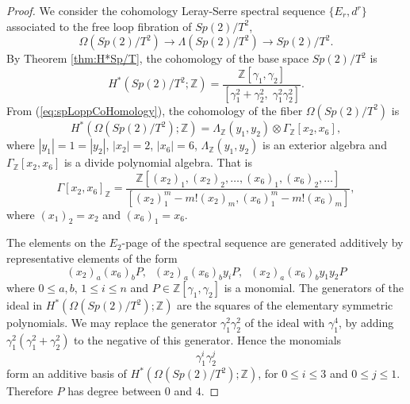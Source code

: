 \documentclass{article}
\theoremstyle{plain}
\theoremstyle{definition}
\numberwithin{thm}{section}
\begin{document}
		\begin{proof}
			We consider the cohomology Leray-Serre spectral sequence $\{ E_r,d^r \}$ associated to the free loop fibration of $Sp(2)/T^2$,
			\begin{equation*}
				\Omega(Sp(2)/T^2)\to\Lambda(Sp(2)/T^2)\to Sp(2)/T^2.
			\end{equation*}
			By Theorem \ref{thm:H*Sp/T},
			the cohomology of the base space $Sp(2)/T^2$ is
			\begin{equation*}
				H^*(Sp(2)/T^2;\mathbb{Z})=\frac{\mathbb{Z}[\gamma_1,\gamma_2]}{[\gamma_1^2+\gamma_2^2,\;\gamma_1^2\gamma_2^2]}.
			\end{equation*}
			From (\ref{eq:spLoppCoHomology}), the cohomology of the fiber $\Omega(Sp(2)/T^2)$ is
			\begin{equation*}
				H^*(\Omega(Sp(2)/T^2);\mathbb{Z})=\Lambda_{\mathbb{Z}}(y_1,y_2)\otimes \Gamma_{\mathbb{Z}}[x_2,x_6],
			\end{equation*}
			where $|y_1|=1=|y_2|$, $|x_2|=2$, $|x_6|=6$, $\Lambda_{\mathbb{Z}}(y_1,y_2)$ is an exterior algebra
			and $\Gamma_{\mathbb{Z}}[x_2,x_6]$ is a divide polynomial algebra.
			That is
			\begin{equation*}
				\Gamma[x_2,x_6]_{\mathbb{Z}}=\frac{\mathbb{Z}[(x_2)_1,(x_2)_2,\dots,(x_6)_1,(x_6)_2,\dots]}{[(x_2)_1^m-m!(x_2)_m, (x_6)_1^m-m!(x_6)_m]},
			\end{equation*}
			where $(x_1)_2=x_2$ and $(x_6)_1=x_6$.
			
			The elements on the $E_2$-page of the spectral sequence are generated additively by representative elements
		  of the form
			\begin{equation*}
				(x_2)_a(x_6)_bP, \;\; (x_2)_a(x_6)_by_iP, \;\; (x_2)_a(x_6)_by_1y_2P
			\end{equation*}
			where $0\leq a,b$, $1\leq i \leq n$ and $P\in \mathbb{Z}[\gamma_1,\gamma_2]$ is a monomial.
			The generators of the ideal in $H^*(\Omega(Sp(2)/T^2);\mathbb{Z})$ 
			are the squares of the elementary symmetric polynomials.
			We may replace the generator $\gamma_1^2\gamma_2^2$ of the ideal with $\gamma_1^4$,
			by adding $\gamma_1^2(\gamma_1^2+\gamma_2^2)$ to the negative of this generator. 		
			Hence the monomials 
			\begin{equation}\label{eq:Sp(2)Basis}
				\gamma_1^i\gamma_2^j
			\end{equation}
			form an additive basis of $H^*(\Omega(Sp(2)/T^2);\mathbb{Z})$, for $0\leq i \leq 3$ and $0\leq j \leq 1$.
			Therefore $P$ has degree between $0$ and $4$.
			

\end{proof}
\end{document}
